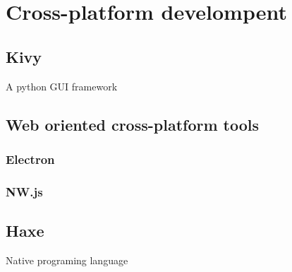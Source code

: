 \chapter{Cross-platform develompent}

\section{Kivy}

A python GUI framework

\section{Web oriented cross-platform tools}

\subsection{Electron}

\subsection{NW.js}


\section{Haxe}

Native programing language

